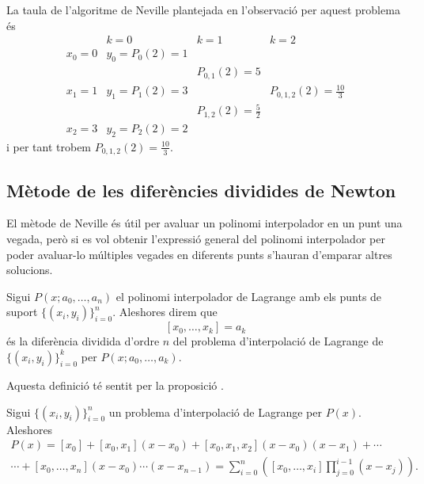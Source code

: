 \documentclass[../Apunts.tex]{subfiles}
\begin{document}
	\begin{solution}
		La taula de l'algoritme de Neville plantejada en l'observació  per aquest problema és
		\[\begin{array}{c|ccc}
		& k=0 & k=1 & k=2 \\\hline
		x_{0}=0 & y_{0}=P_{0}(2)=1 & & \\
		& & P_{0,1}(2)=5 &\\
		x_{1}=1 & y_{1}=P_{1}(2)=3 & & P_{0,1,2}(2)=\frac{10}{3}\\
		& & P_{1,2}(2)=\frac{5}{2} &\\
		x_{2}=3 & y_{2}=P_{2}(2)=2 & &
		\end{array}\]
		i per tant trobem \(P_{0,1,2}(2)=\frac{10}{3}\).
	\end{solution}
	\subsection{Mètode de les diferències dividides de Newton}
	El mètode de Neville és útil per avaluar un polinomi interpolador en un punt una vegada, però si es vol obtenir l'expressió general del polinomi interpolador per poder avaluar-lo múltiples vegades en diferents punts s'hauran d'emparar altres solucions.
	\begin{definition}
		\label{def:diferències dividides}
		Sigui \(P(x;a_{0},\dots,a_{n})\) el polinomi interpolador de Lagrange amb els punts de suport \(\{(x_{i},y_{i})\}_{i=0}^{n}\). Aleshores direm que
		\[[x_{0},\dots,x_{k}]=a_{k}\]
		és 	la diferència dividida d'ordre \(n\) del problema d'interpolació de Lagrange de \(\{(x_{i},y_{i})\}_{i=0}^{k}\) per \(P(x;a_{0},\dots,a_{k})\).
		
		Aquesta definició té sentit per la proposició .
	\end{definition}
	\begin{proposition}\label{prop:Mètode diferències dividides}
		Sigui \(\{(x_{i},y_{i})\}_{i=0}^{n}\) un problema d'interpolació de Lagrange per \(P(x)\). Aleshores
		\begin{multline*}
		P(x)=[x_{0}]+[x_{0},x_{1}](x-x_{0})+[x_{0},x_{1},x_{2}](x-x_{0})(x-x_{1})+\cdots\\\cdots+[x_{0},\dots,x_{n}](x-x_{0})\cdots(x-x_{n-1})=\sum_{i=0}^{n}\left([x_{0},\dots,x_{i}]\prod_{j=0}^{i-1}(x-x_{j})\right).
		\end{multline*}
	\end{proposition}
\end{document}
